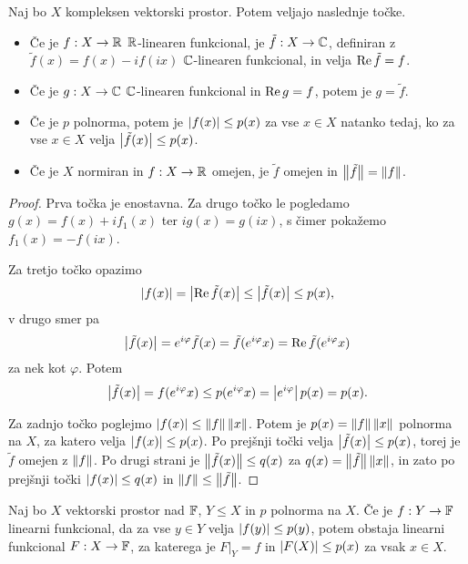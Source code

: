 \begin{lema}
  Naj bo $X$ kompleksen vektorski prostor.
  Potem veljajo naslednje točke.
  \begin{itemize}
  \item Če je $f: X \to \mathbb{R}$ $\mathbb{R}$-linearen funkcional, je $\tilde{f}: X \to \mathbb{C}$,
	definiran z $\tilde{f}(x) = f(x) - i f(ix)$ $\mathbb{C}$-linearen funkcional, in
	velja $\operatorname{Re} \tilde{f} = f$.
  \item Če je $g: X \to \mathbb{C}$ $\mathbb{C}$-linearen funkcional in $\operatorname{Re} g = f$, potem je
	$g = \tilde{f}$.
  \item Če je $p$ polnorma, potem je $\left| f(x) \right| \le p(x)$ za vse $x \in X$
	natanko tedaj, ko za vse $x \in X$ velja $\left| \tilde{f}(x) \right| \le p(x)$.
  \item Če je $X$ normiran in $f: X \to \mathbb{R}$ omejen, je $\tilde{f}$ omejen in
	$\left\lVert\tilde{f}\right\rVert = \left\lVert f\right\rVert$.
  \end{itemize}
\end{lema}

\begin{proof}
  Prva točka je enostavna.
  Za drugo točko le pogledamo $g(x) = f(x) + i f_1(x)$ ter $i g(x) = g(ix)$, s
  čimer pokažemo $f_1(x) = -f(ix)$.

  Za tretjo točko opazimo
  \[
	\left| f(x) \right| = \left| \operatorname{Re} \tilde{f}(x) \right| \le \left| \tilde{f}(x) \right| \le p(x),
  \]
  v drugo smer pa
  \[
	\left| \tilde{f}(x) \right| = e^{i \varphi} \tilde{f}(x) = \tilde{f}(e^{i \varphi} x)
	= \operatorname{Re} \tilde{f}(e^{i \varphi} x)
  \]
  za nek kot $\varphi$.
  Potem
  \[
	\left| \tilde{f}(x) \right| = f(e^{i \varphi} x) \le p(e^{i \varphi} x) = \left| e^{i
		\varphi} \right| p(x) = p(x).
  \]

  Za zadnjo točko poglejmo $\left| f(x) \right| \le \left\lVert f\right\rVert \left\lVert x\right\rVert$.
  Potem je $p(x) = \left\lVert f\right\rVert \left\lVert x\right\rVert$ polnorma na $X$, za katero velja
  $\left| f(x) \right| \le p(x)$.
  Po prejšnji točki velja $\left| \tilde{f}(x) \right| \le p(x)$, torej je $\tilde{f}$
  omejen z $\left\lVert f\right\rVert$.
  Po drugi strani je $\left\lVert\tilde{f}(x)\right\rVert \le q(x)$ za $q(x) = \left\lVert\tilde{f}\right\rVert
  \left\lVert x\right\rVert$, in zato po prejšnji točki $\left| f(x) \right| \le q(x)$ in $\left\lVert f\right\rVert \le
  \left\lVert\tilde{f}\right\rVert$.
\end{proof}

\begin{izrek}
  Naj bo $X$ vektorski prostor nad $\mathbb{F}$, $Y \le X$ in $p$ polnorma na $X$.
  Če je $f: Y \to \mathbb{F}$ linearni funkcional, da za vse $y \in Y$ velja $\left| f(y) \right|
  \le p(y)$, potem obstaja linearni funkcional $F: X \to \mathbb{F}$, za katerega je
  $\left. F \right|_Y = f$ in $\left| F(X) \right| \le p(x)$ za vsak $x \in X$.
\end{izrek}

